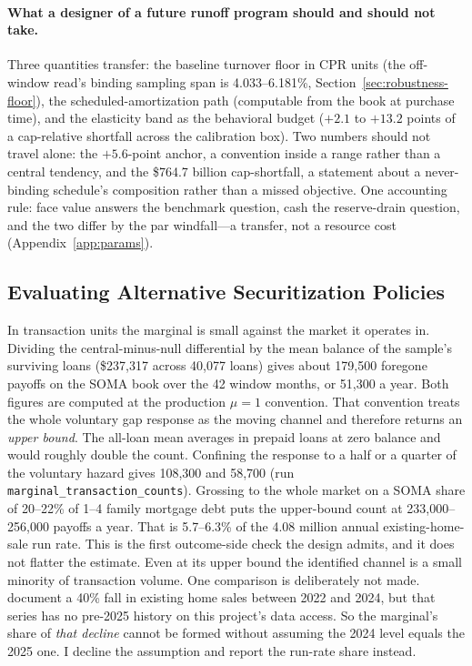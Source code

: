 \documentclass[12pt]{article}
\begin{document}
\paragraph{What a designer of a future runoff program should and should not take.} Three quantities transfer: the baseline turnover floor in CPR units (the off-window read's binding sampling span is 4.033--6.181\%, Section~\ref{sec:robustness-floor}), the scheduled-amortization path (computable from the book at purchase time), and the elasticity band as the behavioral budget ($+2.1$ to $+13.2$ points of a cap-relative shortfall across the calibration box). Two numbers should not travel alone: the $+5.6$-point anchor, a convention inside a range rather than a central tendency, and the \$764.7 billion cap-shortfall, a statement about a never-binding schedule's composition rather than a missed objective. One accounting rule: face value answers the benchmark question, cash the reserve-drain question, and the two differ by the par windfall---a transfer, not a resource cost (Appendix~\ref{app:params}).

\subsection{Evaluating Alternative Securitization Policies}\label{sec:discussion-policy}
In transaction units the marginal is small against the market it operates in. Dividing the central-minus-null differential by the mean balance of the sample's surviving loans (\$237{,}317 across 40{,}077 loans) gives about 179{,}500 foregone payoffs on the SOMA book over the 42 window months, or 51{,}300 a year. Both figures are computed at the production $\mu = 1$ convention. That convention treats the whole voluntary gap response as the moving channel and therefore returns an \emph{upper bound}. The all-loan mean averages in prepaid loans at zero balance and would roughly double the count. Confining the response to a half or a quarter of the voluntary hazard gives 108{,}300 and 58{,}700 (run \texttt{marginal\_transaction\_counts}). Grossing to the whole market on a SOMA share of 20--22\% of 1--4 family mortgage debt puts the upper-bound count at 233{,}000--256{,}000 payoffs a year. That is 5.7--6.3\% of the 4.08 million annual existing-home-sale run rate. This is the first outcome-side check the design admits, and it does not flatter the estimate. Even at its upper bound the identified channel is a small minority of transaction volume. One comparison is deliberately not made. \citet{fonseca2026} document a 40\% fall in existing home sales between 2022 and 2024, but that series has no pre-2025 history on this project's data access. So the marginal's share of \emph{that decline} cannot be formed without assuming the 2024 level equals the 2025 one. I decline the assumption and report the run-rate share instead.
\end{document}
